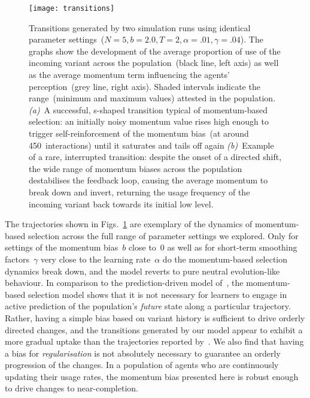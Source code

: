 \begin{figure}
\centering
\texttt{[image: transitions]}
\caption[Successful and unsuccessful transitions generated by two simulation runs using identical parameter settings]{Transitions generated by two simulation runs using identical parameter settings~($N=5, b=2.0, T=2, \alpha=.01, \gamma=.04$). The graphs show the development of the average proportion of use of the incoming variant across the population~(black line, left axis) as well as the average momentum term influencing the agents' perception~(grey line, right axis). Shaded intervals indicate the range~(minimum and maximum values) attested in the population. \textit{(a)}~A successful, s-shaped transition typical of momentum-based selection: an initially noisy momentum value rises high enough to trigger self-reinforcement of the momentum bias~(at around 450~interactions) until it saturates and tails off again \textit{(b)}~Example of a rare, interrupted transition: despite the onset of a directed shift, the wide range of momentum biases across the population destabilises the feedback loop, causing the average momentum to break down and invert, returning the usage frequency of the incoming variant back towards its initial low level.}
\label{fig:transitions}
\end{figure}

The trajectories shown in Figs.~\ref{fig:transitions} are exemplary of the dynamics of momentum-based selection across the full range of parameter settings we explored. Only for settings of the momentum bias~$b$ close to~$0$ as well as for short-term smoothing factors~$\gamma$ very close to the learning rate~$\alpha$ do the momentum-based selection dynamics break down, and the model reverts to pure neutral evolution-like behaviour. In comparison to the prediction-driven model of~\cite{Mitchener2011}, the momentum-based selection model shows that it is not necessary for learners to engage in active prediction of the population's \emph{future} state along a particular trajectory. Rather, having a simple bias based on variant history is sufficient to drive orderly directed changes, and the transitions generated by our model appear to exhibit a more gradual uptake than the trajectories reported by~\citeauthor{Mitchener2011}. We also find that having a bias for \emph{regularisation} is not absolutely necessary to guarantee an orderly progression of the changes. In a population of agents who are continuously updating their usage rates, the momentum bias presented here is robust enough to drive changes to near-completion.

